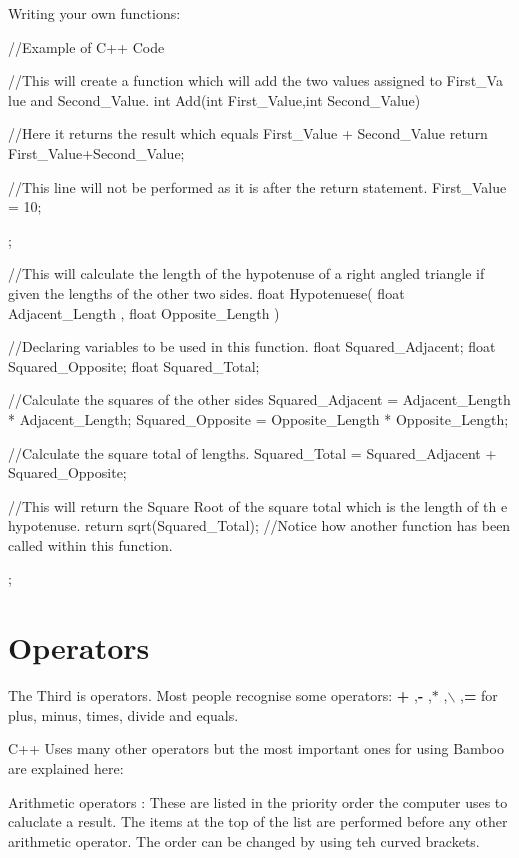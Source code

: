 Writing your own functions: 
\begin{DoxyCode}
 //Example of C++ Code

 //This will create a function which will add the two values assigned to First_Va
      lue and Second_Value.
 int Add(int First_Value,int Second_Value)
 {

 //Here it returns the result which equals First_Value + Second_Value
   return First_Value+Second_Value;

 //This line will not be performed as it is after the return statement.
 First_Value = 10;
 };

 //This will calculate the length of the hypotenuse of a right angled triangle if
       given the lengths of the other two sides.
 float Hypotenuese( float Adjacent_Length , float Opposite_Length )
 {

 //Declaring variables to be used in this function.
 float Squared_Adjacent;
 float Squared_Opposite;
 float Squared_Total;

 //Calculate the squares of the other sides
 Squared_Adjacent = Adjacent_Length * Adjacent_Length;
 Squared_Opposite = Opposite_Length * Opposite_Length;

 //Calculate the square total of lengths.
 Squared_Total = Squared_Adjacent + Squared_Opposite;

 //This will return the Square Root of the square total which is the length of th
      e hypotenuse.
 return sqrt(Squared_Total);
 //Notice how another function has been called within this function.
 };
\end{DoxyCode}
 \hypertarget{_programming_basics_BasicsPageOperators}{}\section{Operators}\label{_programming_basics_BasicsPageOperators}
The Third is operators. Most people recognise some operators: {\bfseries +} ,{\bfseries -\/} ,{\bfseries $\ast$} ,{\bfseries $\backslash$} ,{\bfseries =} for plus, minus, times, divide and equals. \par
 C++ Uses many other operators but the most important ones for using Bamboo are explained here: \par
 Arithmetic operators : These are listed in the priority order the computer uses to caluclate a result. The items at the top of the list are performed before any other arithmetic operator. The order can be changed by using teh curved brackets.
